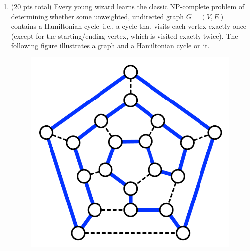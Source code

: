\documentclass[12pt]{article}
\theoremstyle{remark}
\begin{document}
\begin{enumerate}
	
	\item (20 pts total) Every young wizard learns the classic NP-complete problem of determining whether some unweighted, undirected graph $G=(V,E)$ contains a Hamiltonian cycle, i.e., a cycle that visits each vertex exactly once (except for the starting/ending vertex, which is visited exactly twice). The following figure illustrates a graph and a Hamiltonian cycle on it.

\begin{figure}[h!]
\begin{center}
\includegraphics[scale=0.7]{hamiltonian.pdf} 
\end{center}
\vspace{-4mm}
\end{figure}



\end{enumerate}
\end{document}
